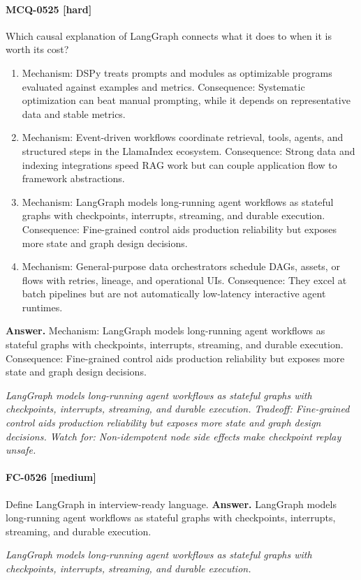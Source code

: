 \paragraph{MCQ-0525 [hard]} Which causal explanation of LangGraph connects what it does to when it is worth its cost?
\begin{enumerate}[label=\Alph*.]
\item Mechanism: DSPy treats prompts and modules as optimizable programs evaluated against examples and metrics. Consequence: Systematic optimization can beat manual prompting, while it depends on representative data and stable metrics.
\item Mechanism: Event-driven workflows coordinate retrieval, tools, agents, and structured steps in the LlamaIndex ecosystem. Consequence: Strong data and indexing integrations speed RAG work but can couple application flow to framework abstractions.
\item Mechanism: LangGraph models long-running agent workflows as stateful graphs with checkpoints, interrupts, streaming, and durable execution. Consequence: Fine-grained control aids production reliability but exposes more state and graph design decisions.
\item Mechanism: General-purpose data orchestrators schedule DAGs, assets, or flows with retries, lineage, and operational UIs. Consequence: They excel at batch pipelines but are not automatically low-latency interactive agent runtimes.
\end{enumerate}
\noindent\textbf{Answer.} Mechanism: LangGraph models long-running agent workflows as stateful graphs with checkpoints, interrupts, streaming, and durable execution. Consequence: Fine-grained control aids production reliability but exposes more state and graph design decisions.
\par\textit{LangGraph models long-running agent workflows as stateful graphs with checkpoints, interrupts, streaming, and durable execution. Tradeoff: Fine-grained control aids production reliability but exposes more state and graph design decisions. Watch for: Non-idempotent node side effects make checkpoint replay unsafe.}
\paragraph{FC-0526 [medium]} Define LangGraph in interview-ready language.
\noindent\textbf{Answer.} LangGraph models long-running agent workflows as stateful graphs with checkpoints, interrupts, streaming, and durable execution.
\par\textit{LangGraph models long-running agent workflows as stateful graphs with checkpoints, interrupts, streaming, and durable execution.}
